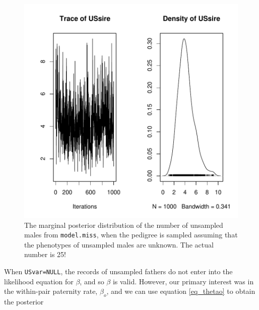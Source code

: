 \documentclass{article}
\begin{document}
\begin{figure}[!h]
\begin{center}
\includegraphics{Tutorial-070}
\end{center}
\caption{The marginal posterior distribution of the number of unsampled males from \texttt{model.miss}, when the pedigree is sampled assuming that the phenotypes of unsampled males are unknown. The actual number is 25!}
\label{EPP1US-fig}
\end{figure}

When \texttt{USvar=NULL}, the records of unsampled fathers do not enter into the likelihood equation for $\beta$, and so $\beta$ is valid.  However, our primary interest was in the within-pair paternity rate, $\beta_{o}$, and we can use equation \ref{eq_thetao} to obtain the posterior

\begin{Schunk}
\end{Schunk}
\end{document}
